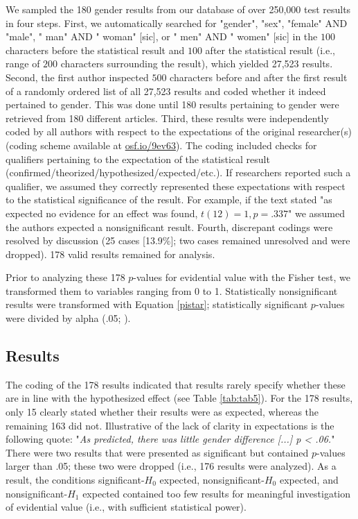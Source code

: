 \documentclass{article}
\begin{document}
We sampled the 180 gender results from our database of over 250,000 test results in four steps. First, we automatically searched for "gender", "sex", "female" AND "male", " man" AND " woman" [sic], or " men" AND " women" [sic] in the $100$ characters before the statistical result and $100$ after the statistical result (i.e., range of $200$ characters surrounding the result), which yielded 27,523 results. Second, the first author inspected $500$ characters before and after the first result of a randomly ordered list of all 27,523 results and coded whether it indeed pertained to gender. This was done until 180 results pertaining to gender were retrieved from 180 different articles. Third, these results were independently coded by all authors with respect to the expectations of the original researcher(s) (coding scheme available at \url{osf.io/9ev63}). The coding included checks for qualifiers pertaining to the expectation of the statistical result (confirmed/theorized/hypothesized/expected/etc.). If researchers reported such a qualifier, we assumed they correctly represented these expectations with respect to the statistical significance of the result. For example, if the text stated "as expected no evidence for an effect was found, $t(12)=1, p=.337$" we assumed the authors expected a nonsignificant result. Fourth, discrepant codings were resolved by discussion (25 cases [13.9\%]; two cases remained unresolved and were dropped). 178 valid results remained for analysis.

Prior to analyzing these 178 $p$-values for evidential value with the Fisher test, we transformed them to variables ranging from 0 to 1. Statistically nonsignificant results were transformed with Equation \ref{pistar}; statistically significant $p$-values were divided by alpha (.05; \cite{Van_Assen2015-gg,Simonsohn2014-dm}).

\subsection*{Results}


The coding of the 178 results indicated that results rarely specify whether these are in line with the hypothesized effect (see Table \ref{tab:tab5}). For the 178 results, only 15 clearly stated whether their results were as expected, whereas the remaining 163 did not. Illustrative of the lack of clarity in expectations is the following quote: "\textit{As predicted, there was little gender difference [...] p < .06.}" There were two results that were presented as significant but contained $p$-values larger than .05; these two were dropped (i.e., 176 results were analyzed). As a result, the conditions significant-$H_0$ expected, nonsignificant-$H_0$ expected, and nonsignificant-$H_1$ expected contained too few results for meaningful investigation of evidential value (i.e., with sufficient statistical power).
\end{document}
